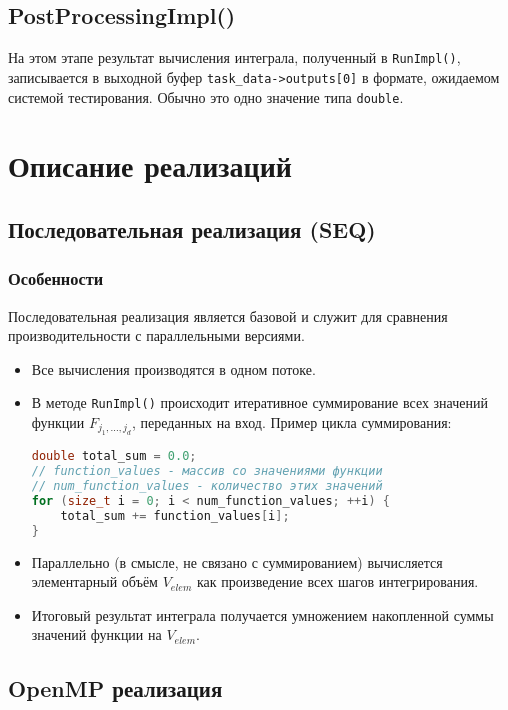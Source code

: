 \documentclass[12pt]{article}
\begin{document}
\subsection*{PostProcessingImpl()}
На этом этапе результат вычисления интеграла, полученный в \texttt{RunImpl()}, записывается в выходной буфер \texttt{task\_data->outputs[0]} в формате, ожидаемом системой тестирования. Обычно это одно значение типа \texttt{double}.
\newpage

\section{Описание реализаций}

\subsection{Последовательная реализация (SEQ)}
\subsubsection*{Особенности}
Последовательная реализация является базовой и служит для сравнения производительности с параллельными версиями.
\begin{itemize}
  \item Все вычисления производятся в одном потоке.
  \item В методе \texttt{RunImpl()} происходит итеративное суммирование всех значений функции $F_{j_1, \dots, j_d}$, переданных на вход. Пример цикла суммирования:
\begin{lstlisting}[language=C++, basicstyle=\small\ttfamily, frame=none, numbers=none]
double total_sum = 0.0;
// function_values - массив со значениями функции
// num_function_values - количество этих значений
for (size_t i = 0; i < num_function_values; ++i) {
    total_sum += function_values[i];
}
\end{lstlisting}
  \item Параллельно (в смысле, не связано с суммированием) вычисляется элементарный объём $V_{elem}$ как произведение всех шагов интегрирования.
  \item Итоговый результат интеграла получается умножением накопленной суммы значений функции на $V_{elem}$.
\end{itemize}

\subsection{OpenMP реализация}
\end{document}
